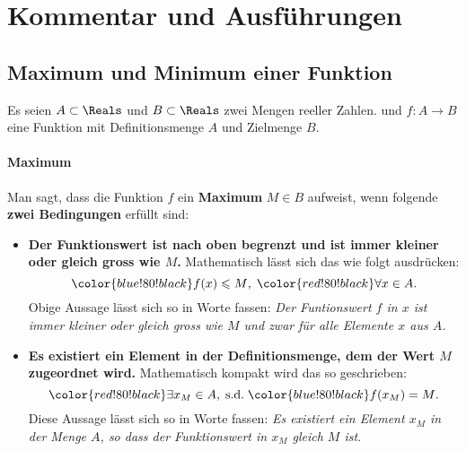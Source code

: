\documentclass[12pt]{article}
\begin{document}
\newpage
\appendix
\section{Kommentar und Ausführungen}
\subsection{Maximum und Minimum einer Funktion}
Es seien $A \subset \Reals$ und $B \subset \Reals$ zwei Mengen reeller Zahlen. und $f : A \rightarrow B$ eine Funktion mit Definitionsmenge $A$ und Zielmenge $B$.
\paragraph{Maximum}
Man sagt, dass die Funktion $f$ ein \textbf{Maximum} $M \in B$ aufweist, wenn folgende \textbf{zwei Bedingungen} erfüllt sind:
\begin{itemize}
\item \textbf{Der Funktionswert ist nach oben begrenzt und ist immer kleiner oder gleich gross wie $M$.} Mathematisch lässt sich das wie folgt ausdrücken: $${\color{blue!80!black}f(x) \leqslant M}, \; {\color{red!80!black}\forall x \in A}.$$
{\footnotesize
Obige Aussage lässt sich so in Worte fassen: \emph{{\color{blue!80!black}Der Funtionswert $f$ in $x$ ist immer kleiner oder gleich gross wie $M$} {\color{red!80!black}und zwar für alle Elemente $x$ aus $A$}.}}
\item \textbf{Es existiert ein Element in der Definitionsmenge, dem der Wert $M$ zugeordnet wird.} Mathematisch kompakt wird das so geschrieben: $${\color{red!80!black}\exists x_M \in A}, \; \text{s.d.} \; {\color{blue!80!black}f(x_M) = M}.$$
{\footnotesize Diese Aussage lässt sich so in Worte fassen: \emph{{\color{red!80!black}Es existiert ein Element $x_M$ in der Menge $A$}, so dass {\color{blue!80!black}der Funktionswert in $x_M$ gleich $M$ ist}}}.
\end{itemize}
\end{document}
